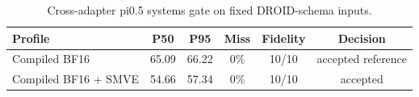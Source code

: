 \begin{table}
\caption{Cross-adapter pi0.5 systems gate on fixed DROID-schema inputs.}
\label{tab:cross_adapter}
\centering\small
\begin{tabular}{lccccc}
\toprule
Profile & P50 & P95 & Miss & Fidelity & Decision \\
\midrule
Compiled BF16 & 65.09 & 66.22 & 0\% & 10/10 & accepted reference \\
Compiled BF16 + SMVE & 54.66 & 57.34 & 0\% & 10/10 & accepted \\
\bottomrule
\end{tabular}
\end{table}
